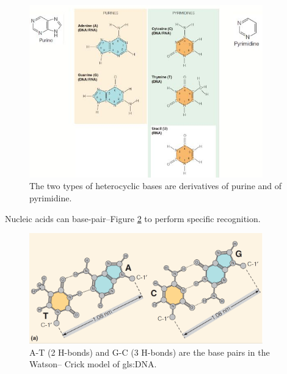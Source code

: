 \documentclass[]{article}
\begin{document}
\begin{figure}[H]
	\caption[The heterocyclic bases are
	derivatives of purine and of pyrimidine]{The two types of heterocyclic bases are
		derivatives of purine and of pyrimidine.}\label{fig:Nucleobases} 
	\includegraphics[width=0.9\textwidth]{Nucleobases}
\end{figure}

Nucleic acids can base-pair--Figure \ref{fig:BasePairs} to perform specific recognition.
\begin{figure}[H]
	\caption[A-T  and G-C are the base pairs in the Watson–
		Crick model]{A-T (2 H-bonds) and G-C (3 H-bonds) are the base pairs in the Watson–
		Crick model of \gls{gls:DNA}.}\label{fig:BasePairs} 
	\includegraphics[width=0.9\textwidth]{BasePairs}
\end{figure}
\end{document}
